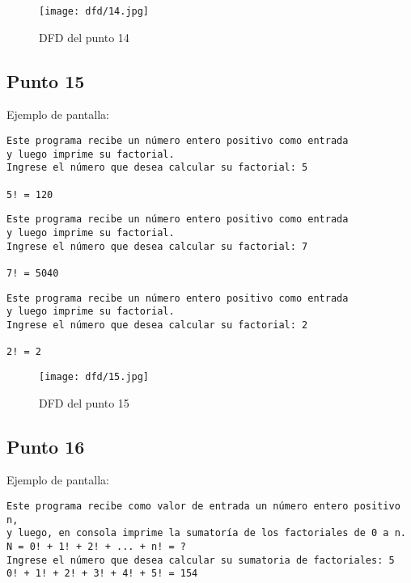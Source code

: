\begin{figure}
    \centering
    \texttt{[image: dfd/14.jpg]}
    \caption{ DFD del punto 14}
    \label{fig: DFD del punto 14}
\end{figure}




\subsection{Punto 15}
	
	Ejemplo de pantalla:
\begin{lstlisting}
Este programa recibe un número entero positivo como entrada
y luego imprime su factorial.
Ingrese el número que desea calcular su factorial: 5

5! = 120
\end{lstlisting}

\begin{lstlisting}
Este programa recibe un número entero positivo como entrada
y luego imprime su factorial.
Ingrese el número que desea calcular su factorial: 7

7! = 5040
\end{lstlisting}

\begin{lstlisting}
Este programa recibe un número entero positivo como entrada
y luego imprime su factorial.
Ingrese el número que desea calcular su factorial: 2

2! = 2
\end{lstlisting}

\begin{figure}
    \centering
    \texttt{[image: dfd/15.jpg]}
    \caption{ DFD del punto 15}
    \label{fig: DFD del punto 15}
\end{figure}




\subsection{Punto 16}
	
	Ejemplo de pantalla:
\begin{lstlisting}
Este programa recibe como valor de entrada un número entero positivo n,
y luego, en consola imprime la sumatoría de los factoriales de 0 a n.
N = 0! + 1! + 2! + ... + n! = ?
Ingrese el número que desea calcular su sumatoria de factoriales: 5
0! + 1! + 2! + 3! + 4! + 5! = 154
\end{lstlisting}

